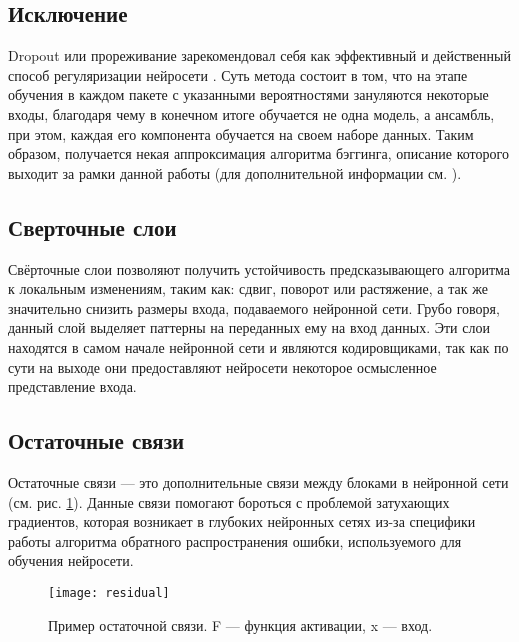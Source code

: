 \subsection{Исключение}
Dropout или прореживание зарекомендовал себя как эффективный и действенный
способ регуляризации нейросети \cite{dropout-is-good}. Суть метода состоит в
том, что на этапе обучения в каждом пакете с указанными вероятностями
зануляются некоторые входы, благодаря чему в конечном итоге обучается не одна
модель, а ансамбль, при этом, каждая его компонента обучается на своем наборе
данных. Таким образом, получается некая аппроксимация алгоритма бэггинга,
описание которого выходит за рамки данной работы (для дополнительной информации
см. \cite{goodfellow}).

\subsection{Сверточные слои}
Свёрточные слои \cite{goodfellow} позволяют получить устойчивость
предсказывающего алгоритма к локальным изменениям, таким как: сдвиг, поворот
или растяжение, а так же значительно снизить размеры входа, подаваемого
нейронной сети. Грубо говоря, данный слой выделяет паттерны на переданных ему
на вход данных. Эти слои находятся в самом начале нейронной сети и являются
кодировщиками, так как по сути на выходе они предоставляют нейросети некоторое
осмысленное представление входа.

\subsection{Остаточные связи}
Остаточные связи \cite{residual} --- это дополнительные связи между блоками
в нейронной сети (см. рис. \ref{fig:residual}). Данные связи помогают бороться с проблемой
затухающих градиентов, которая возникает в глубоких нейронных сетях из-за
специфики работы алгоритма обратного распространения ошибки, используемого для
обучения нейросети.

\begin{figure}[!htb]
	\centering
	\caption{Пример остаточной связи. F --- функция активации, x --- вход.}
	\texttt{[image: residual]}
	\label{fig:residual}
\end{figure}
